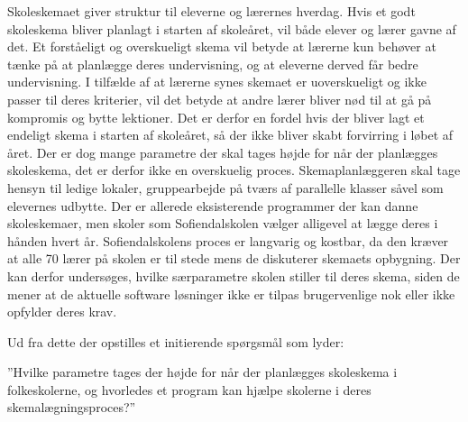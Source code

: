 Skoleskemaet giver struktur til eleverne og lærernes hverdag. Hvis et godt skoleskema bliver planlagt i starten af skoleåret, vil både elever og lærer gavne af det. Et forståeligt og overskueligt skema vil betyde at lærerne kun behøver at tænke på at planlægge deres undervisning, og at eleverne derved får bedre undervisning. I tilfælde af at lærerne synes skemaet er uoverskueligt og ikke passer til deres kriterier, vil det betyde at andre lærer bliver nød til at gå på kompromis og bytte lektioner\cite{biblop1:19}. Det er derfor en fordel hvis der bliver lagt et endeligt skema i starten af skoleåret, så der ikke bliver skabt forvirring i løbet af året. 
Der er dog mange parametre der skal tages højde for når der planlægges skoleskema, det er derfor ikke en overskuelig proces. Skemaplanlæggeren skal tage hensyn til ledige lokaler, gruppearbejde på tværs af parallelle klasser såvel som elevernes udbytte. Der er allerede eksisterende programmer der kan danne skoleskemaer, men skoler som Sofiendalskolen vælger alligevel at lægge deres i hånden hvert år. Sofiendalskolens proces er langvarig og kostbar, da den kræver at alle 70 lærer på skolen er til stede mens de diskuterer skemaets opbygning. Der kan derfor undersøges, hvilke særparametre skolen stiller til deres skema, siden de mener at de aktuelle software løsninger ikke er tilpas brugervenlige nok eller ikke opfylder deres krav\cite{biblop1:19}. 

Ud fra dette der opstilles et initierende spørgsmål som lyder:

”Hvilke parametre tages der højde for når der planlægges skoleskema i folkeskolerne, og hvorledes et program kan hjælpe skolerne i deres skemalægningsproces?”
